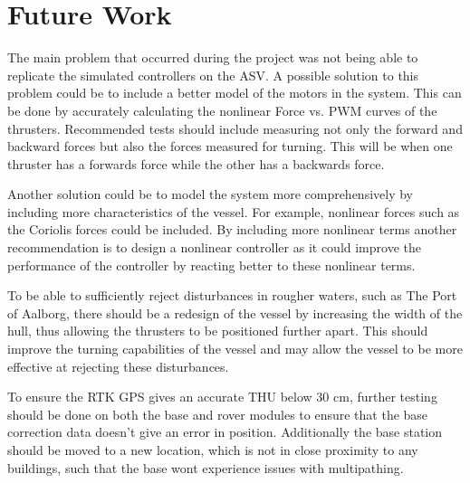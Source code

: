 \chapter{Future Work}

The main problem that occurred during the project was not being able to replicate the simulated controllers on the ASV. A possible solution to this problem could be to include a better model of the motors in the system. This can be done by accurately calculating the nonlinear Force vs. PWM curves of the thrusters. Recommended tests should include measuring not only the forward and backward forces but also the forces measured for turning. This will be when one thruster has a forwards force while the other has a backwards force.

Another solution could be to model the system more comprehensively by including more characteristics of the vessel. For example, nonlinear forces such as the Coriolis forces could be included. By including more nonlinear terms another recommendation is to design a nonlinear controller as it could improve the performance of the controller by reacting better to these nonlinear terms.

To be able to sufficiently reject disturbances in rougher waters, such as The Port of Aalborg, there should be a redesign of the vessel by increasing the width of the hull, thus allowing the thrusters to be positioned further apart. This should improve the turning capabilities of the vessel and may allow the vessel to be more effective at rejecting these disturbances.

To ensure the RTK GPS gives an accurate THU below 30 cm, further testing should be done on both the base and rover modules to ensure that the base correction data doesn't give an error in position.
Additionally the base station should be moved to a new location, which is not in close proximity to any buildings, such that the base wont experience issues with multipathing.



% 

